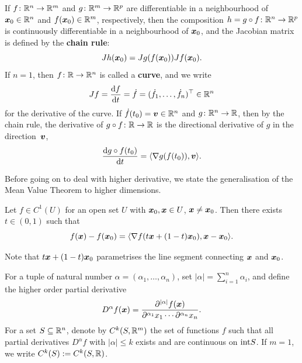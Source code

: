 If $f\colon \mathbb{R}^n\to \mathbb{R}^m$ and $g\colon \mathbb{R}^m\to \mathbb{R}^p$ are differentiable in a neighbourhood of $\bm{x}_0\in \mathbb{R}^n$ and $f(\bm{x}_0)\in \mathbb{R}^m$, respectively, then the composition $h=g\circ f\colon \mathbb{R}^n\to \mathbb{R}^p$ is continuously differentiable in a neighbourhood of $\bm{x}_0$, and the Jacobian matrix is defined by the \textbf{chain rule}:
\begin{equation*}
 Jh(\bm{x}_0) = Jg(f(\bm{x}_0))Jf(\bm{x}_0).
\end{equation*}
If $n=1$, then $f\colon \mathbb{R}\to \mathbb{R}^n$ is called a \textbf{curve}, and we write 
\begin{equation*}
 Jf = \frac{\mathrm{d}{f}}{\mathrm{d}{t}}=\dot{f}=(\dot{f}_1,\dots,\dot{f}_n)^{\top}\in \mathbb{R}^n
\end{equation*}
for the derivative of the curve. If $\dot{f}(t_0)=\bm{v}\in \mathbb{R}^n$ and $g\colon \mathbb{R}^n\to \mathbb{R}$, then by the chain rule, the derivative of $g\circ f\colon \mathbb{R}\to \mathbb{R}$ is the directional derivative of $g$ in the direction~$\bm{v}$,
\begin{equation*}
 \frac{\mathrm{d}{g\circ f}(t_0)}{\mathrm{d}{t}} = \langle {\nabla g(f(t_0))}, {\bm{v}} \rangle.
\end{equation*}

Before going on to deal with higher derivative, we state the generalisation of the Mean Value Theorem to higher dimensions.

\begin{theorem*}
\strictpagecheck{}
Let $f\in C^1(U)$ for an open set $U$ with $\bm{x}_0,\bm{x}\in U$, $\bm{x}\neq \bm{x}_0$. Then there exists $t\in (0,1)$ such that
\begin{equation*}
  f(\bm{x})-f(\bm{x}_0) = \langle {\nabla f(t\bm{x}+(1-t)\bm{x}_0)}, {\bm{x}-\bm{x}_0} \rangle.
\end{equation*}
\end{theorem*}
Note that $t\bm{x}+(1-t)\bm{x}_0$ parametrises the line segment connecting $\bm{x}$ and $\bm{x}_0$. 

For a tuple of natural number $\alpha = (\alpha_1,\dots,\alpha_n)$, set $|\alpha|=\sum_{i=1}^n \alpha_i$, and define the higher order partial derivative
\begin{equation*}
 D^\alpha f(\bm{x}) = \frac{\partial^{|\alpha|}f(\bm{x})}{\partial^{\alpha_1}x_1\cdots \partial^{\alpha_n}x_n}.
\end{equation*}
For a set $S\subseteq \mathbb{R}^n$, denote by $C^k(S,\mathbb{R}^m)$ the set of functions $f$ such that all partial derivatives $D^\alpha f$ with $|\alpha|\leq k$ exists and are continuous on ${\operatorname{int}} S$. If $m=1$, we write $C^k(S):=C^k(S,\mathbb{R})$.

